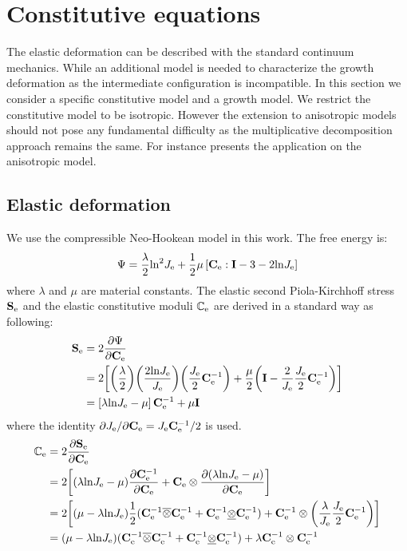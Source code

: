 \section{Constitutive equations}
The elastic deformation can be described with the standard continuum mechanics. While an additional model is needed to characterize the growth deformation as the intermediate configuration is incompatible. In this section we consider a specific constitutive model and a growth model. We restrict the constitutive model to be isotropic. However the extension to anisotropic models should not pose any fundamental difficulty as the multiplicative decomposition approach remains the same. For instance \cite{Goktepe2} presents the application on the anisotropic model.

\subsection{Elastic deformation}
We use the compressible Neo-Hookean model in this work. The free energy is:
\begin{equation}
\Psi = \frac{\lambda}{2}\mathrm{ln}^2 J_{\mathrm{e}} + \frac{1}{2}\mu \left[ \bold{C}_{\mathrm{e}} : \bold{I} - 3 - 2\mathrm{ln} J_{\mathrm{e}} \right]
\end{equation}
where $\lambda$ and $\mu$ are material constants. The elastic second Piola-Kirchhoff stress $\bold{S}_{\mathrm{e}}$ and the elastic constitutive moduli $\mathbb{C}_{\mathrm{e}}$ are derived in a standard way as following:
\begin{equation} \label{eq:Se}
\begin{split}
\bold{S}_{\mathrm{e}} &= 2\frac{\partial \Psi}{\partial \bold{C}_{\mathrm{e}}} \\
	&= 2\bigg[  \bigg( \frac{\lambda}{2} \bigg) \bigg( \frac{2\mathrm{ln}J_{\mathrm{e}}}{J_{\mathrm{e}}} \bigg)       \bigg( \frac{J_{\mathrm{e}}}{2} \bold{C}_{\mathrm{e}}^{-1} \bigg) + \frac{\mu}{2} \bigg( \bold{I} - \frac{2}{J_{\mathrm{e}}} \frac{J_{\mathrm{e}}}{2} \bold{C}_{\mathrm{e}}^{-1} \bigg) \bigg] \\
	&= \left[ \lambda \mathrm{ln}J_{\mathrm{e}} - \mu\right]\bold{C}_{\mathrm{e}}^{-1} + \mu\bold{I}
\end{split}
\end{equation}
where the identity ${\partial J_{\mathrm{e}}}/{\partial \bold{C}_{\mathrm{e}}} = J_{\mathrm{e}} \bold{C}_{\mathrm{e}}^{-1}/2$ is used.
\begin{equation} \label{eq:Ce}
\begin{split}
\mathbb{C}_{\mathrm{e}} &= 2\frac{\partial \bold{S}_{\mathrm{e}}}{\partial \bold{C}_{\mathrm{e}}} \\
	&= 2\bigg[ (\lambda \mathrm{ln}J_{\mathrm{e}} - \mu) \frac{\partial \bold{C}_{\mathrm{e}}^{-1}}{\partial \bold{C}_{\mathrm{e}}} + \bold{C}_{\mathrm{e}} \otimes \frac{\partial (\lambda \mathrm{ln}J_{\mathrm{e}} - \mu)}{\partial \bold{C}_{\mathrm{e}}}\bigg] \\
	&= 2\bigg[ (\mu - \lambda \mathrm{ln}J_{\mathrm{e}}) \frac{1}{2}(\bold{C}_{\mathrm{e}}^{-1} \overline\otimes \bold{C}_{\mathrm{e}}^{-1} + \bold{C}_{\mathrm{e}}^{-1} \underline\otimes \bold{C}_{\mathrm{e}}^{-1}) + \bold{C}_{\mathrm{e}}^{-1} \otimes \bigg( \frac{\lambda}{J_{\mathrm{e}}}\frac{J_{\mathrm{e}}}{2} \bold{C}_{\mathrm{e}}^{-1} \bigg) \bigg] \\
	&= (\mu - \lambda \mathrm{ln}J_{\mathrm{e}}) (\bold{C}_{\mathrm{e}}^{-1} \overline\otimes \bold{C}_{\mathrm{e}}^{-1} + \bold{C}_{\mathrm{e}}^{-1} \underline\otimes \bold{C}_{\mathrm{e}}^{-1} ) + \lambda \bold{C}_{\mathrm{e}}^{-1} \otimes \bold{C}_{\mathrm{e}}^{-1}
\end{split}
\end{equation}
